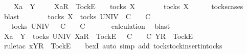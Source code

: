 \begin{isabellebody}
\isamarkupfalse%
\isanewline
\ \ \isamarkupfalse%
\ Xa\ {\isasymrho}\ Y\ {\isasymsigma}\isanewline
\ \ \isamarkupfalse%
\ {\isachardoublequoteopen}{\isacharbrackleft}Xa{\isacharbrackright}\isactrlsub R\ {\isacharhash}\ {\isacharbrackleft}Tock{\isacharbrackright}\isactrlsub E\ {\isacharhash}\ {\isasymrho}\ {\isasymin}\ tocks\ X{\isachardoublequoteclose}\isanewline
\ \ \isamarkupfalse%
\ \isamarkupfalse%
\ {\isachardoublequoteopen}{\isasymrho}\ {\isasymin}\ tocks\ X{\isachardoublequoteclose}\isanewline
\ \ \ \ \isamarkupfalse%
\ tocks{\isachardot}cases\ \isamarkupfalse%
\ blast\isanewline
\ \ \isamarkupfalse%
\ \isamarkupfalse%
\ {\isachardoublequoteopen}{\isasymrho}\ {\isasymin}\ tocks\ X\ {\isasymLongrightarrow}\ {\isasymexists}{\isasymrho}{\isacharprime}{\isasymin}tocks\ UNIV{\isachardot}\ {\isasymrho}\ {\isasymsubseteq}\isactrlsub C\ {\isasymrho}{\isacharprime}\ {\isasymand}\ {\isasymrho}{\isacharprime}\ {\isasymle}\isactrlsub C\ {\isasymsigma}{\isachardoublequoteclose}\isanewline
\ \ \isamarkupfalse%
\ \isamarkupfalse%
\ {\isasymrho}{\isacharprime}\ \ {\isachardoublequoteopen}{\isasymrho}{\isacharprime}{\isasymin}tocks\ UNIV\ {\isasymand}\ {\isasymrho}\ {\isasymsubseteq}\isactrlsub C\ {\isasymrho}{\isacharprime}\ {\isasymand}\ {\isasymrho}{\isacharprime}\ {\isasymle}\isactrlsub C\ {\isasymsigma}{\isachardoublequoteclose}\isanewline
\ \ \ \ \isamarkupfalse%
\ calculation\ \isamarkupfalse%
\ blast\isanewline
\ \ \isamarkupfalse%
\ \isamarkupfalse%
\ {\isachardoublequoteopen}Xa\ {\isasymsubseteq}\ Y\ {\isasymLongrightarrow}\ {\isasymexists}{\isasymrho}{\isacharprime}{\isasymin}tocks\ UNIV{\isachardot}\ {\isacharbrackleft}Xa{\isacharbrackright}\isactrlsub R\ {\isacharhash}\ {\isacharbrackleft}Tock{\isacharbrackright}\isactrlsub E\ {\isacharhash}\ {\isasymrho}\ {\isasymsubseteq}\isactrlsub C\ {\isasymrho}{\isacharprime}\ {\isasymand}\ {\isasymrho}{\isacharprime}\ {\isasymle}\isactrlsub C\ {\isacharbrackleft}Y{\isacharbrackright}\isactrlsub R\ {\isacharhash}\ {\isacharbrackleft}Tock{\isacharbrackright}\isactrlsub E\ {\isacharhash}\ {\isasymsigma}{\isachardoublequoteclose}\isanewline
\ \ \ \ \isamarkupfalse%
\ {\isacharparenleft}rule{\isacharunderscore}tac\ x{\isacharequal}{\isachardoublequoteopen}{\isacharbrackleft}Y{\isacharbrackright}\isactrlsub R\ {\isacharhash}\ {\isacharbrackleft}Tock{\isacharbrackright}\isactrlsub E\ {\isacharhash}\ {\isasymrho}{\isacharprime}{\isachardoublequoteclose}\ \ bexI{\isacharcomma}\ auto\ simp\ add{\isacharcolon}\ tocks{\isachardot}tock{\isacharunderscore}insert{\isacharunderscore}in{\isacharunderscore}tocks{\isacharparenright}\isanewline

\end{isabellebody}
